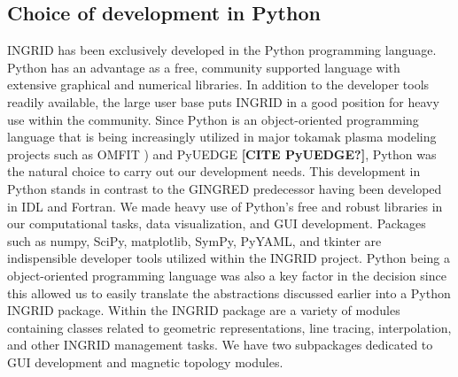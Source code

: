 \subsection{\label{sec:level2}Choice of development in Python}
INGRID has been exclusively developed in the Python programming language. Python has an advantage as a free, community supported language with extensive graphical and numerical libraries. In addition to the developer tools readily available, the large user base puts INGRID in a good position for heavy use within the community. Since Python is an object-oriented programming language that is being increasingly utilized in major tokamak plasma modeling projects such as OMFIT \cite{Meneghini_2015, Orso_MENEGHINI2013}) and PyUEDGE \textbf{[CITE PyUEDGE?]}, Python was the natural choice to carry out our development needs. This development in Python stands in contrast to the GINGRED predecessor having been developed in IDL and Fortran. We made heavy use of Python's free and robust libraries in our computational tasks, data visualization, and GUI development. Packages such as numpy, SciPy, matplotlib, SymPy, PyYAML, and tkinter are indispensible developer tools utilized within the INGRID project\cite{numpy_5725236, virtanen2019scipy, matplotlib_4160265}. Python being a object-oriented programming language was also a key factor in the decision since this allowed us to easily translate the abstractions discussed earlier into a Python INGRID package. Within the INGRID package are a variety of modules containing classes related to geometric representations, line tracing, interpolation, and other INGRID management tasks. We have two subpackages dedicated to GUI development and magnetic topology modules. 
